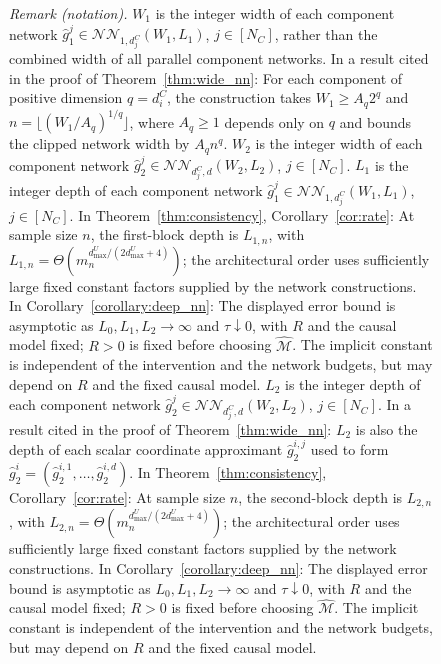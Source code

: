 \begin{figure}[!tb]
\begin{minipage}[t]{0.49\textwidth}
{\noindent\textit{Remark (notation).} $W_1$ is the integer width of each component network $\hat{g}_1^j\in\mathcal{NN}_{1,d_j^C}(W_1,L_1)$, $j\in[N_C]$, rather than the combined width of all parallel component networks. In a result cited in the proof of Theorem~\ref{thm:wide_nn}: For each component of positive dimension $q=d_i^C$, the construction takes $W_1\geqslant A_q2^q$ and $n=\lfloor(W_1/A_q)^{1/q}\rfloor$, where $A_q\geqslant1$ depends only on $q$ and bounds the clipped network width by $A_qn^q$. $W_2$ is the integer width of each component network $\hat{g}_2^j\in\mathcal{NN}_{d_j^C,d}(W_2,L_2)$, $j\in[N_C]$. $L_1$ is the integer depth of each component network $\hat{g}_1^j\in\mathcal{NN}_{1,d_j^C}(W_1,L_1)$, $j\in[N_C]$. In Theorem~\ref{thm:consistency}, Corollary~\ref{cor:rate}: At sample size $n$, the first-block depth is $L_{1,n}$, with $L_{1,n}=\Theta(m_n^{d_{\max}^U/(2d_{\max}^U+4)})$; the architectural order uses sufficiently large fixed constant factors supplied by the network constructions. In Corollary~\ref{corollary:deep_nn}: The displayed error bound is asymptotic as $L_0,L_1,L_2\to\infty$ and $\tau\downarrow0$, with $R$ and the causal model fixed; $R>0$ is fixed before choosing $\hat{\mathcal M}$. The implicit constant is independent of the intervention and the network budgets, but may depend on $R$ and the fixed causal model. $L_2$ is the integer depth of each component network $\hat{g}_2^j\in\mathcal{NN}_{d_j^C,d}(W_2,L_2)$, $j\in[N_C]$. In a result cited in the proof of Theorem~\ref{thm:wide_nn}: $L_2$ is also the depth of each scalar coordinate approximant $\hat{g}_2^{i,j}$ used to form $\hat{g}_2^i=(\hat{g}_2^{i,1},\ldots,\hat{g}_2^{i,d})$. In Theorem~\ref{thm:consistency}, Corollary~\ref{cor:rate}: At sample size $n$, the second-block depth is $L_{2,n}$, with $L_{2,n}=\Theta(m_n^{d_{\max}^U/(2d_{\max}^U+4)})$; the architectural order uses sufficiently large fixed constant factors supplied by the network constructions. In Corollary~\ref{corollary:deep_nn}: The displayed error bound is asymptotic as $L_0,L_1,L_2\to\infty$ and $\tau\downarrow0$, with $R$ and the causal model fixed; $R>0$ is fixed before choosing $\hat{\mathcal M}$. The implicit constant is independent of the intervention and the network budgets, but may depend on $R$ and the fixed causal model.










}
\end{minipage}
\end{figure}
